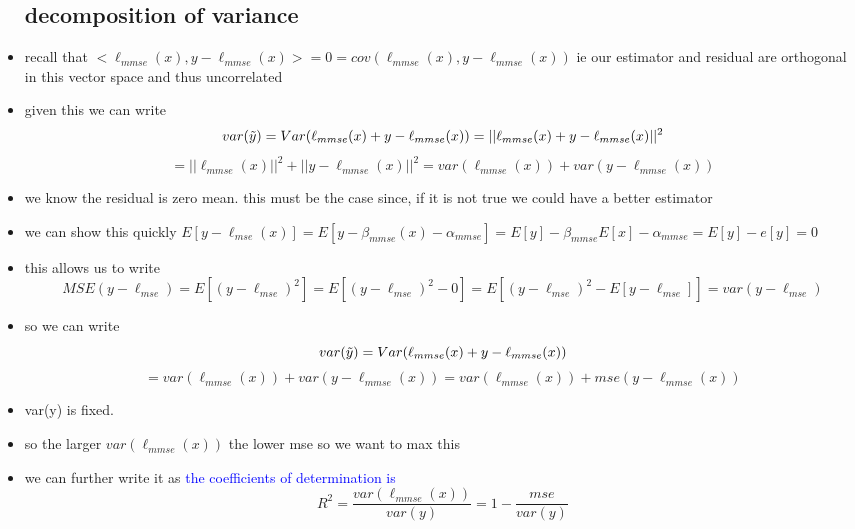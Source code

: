 \documentclass{article}
\begin{document}
\begin{itemize}
\subsection*{decomposition of variance}
\item recall that $<\ell_{mmse}(x), y-\ell_{mmse}(x)>=0=cov(\ell_{mmse}(x), y-\ell_{mmse}(x))$ ie our estimator and residual are orthogonal
in this vector space and thus uncorrelated
\item given this we can write $$var(\Tilde{y})=Var(\ell_{mmse}(x) + y-\ell_{mmse}(x))=||\ell_{mmse}(x) + y-\ell_{mmse}(x)||^2$$ 
$$=||\ell_{mmse}(x)||^2 + ||y-\ell_{mmse}(x)||^2=var(\ell_{mmse}(x)) + var(y-\ell_{mmse}(x))$$
\item we know the residual is zero mean. this must be the case since, if it is not true we could have a better estimator 
\item we can show this quickly $E[y-\ell_{mse}(x)]=E[y-\beta_{mmse}(x) -\alpha_{mmse}]=E[y]-\beta_{mmse}E[x] -\alpha_{mmse}
=E[y]-e[y]=0$
\item this allows us to write $$MSE(y-\ell_{mse})=E[(y-\ell_{mse})^2]=E[(y-\ell_{mse})^2-0]=E[(y-\ell_{mse})^2-E[y-\ell_{mse}]]=var(y-\ell_{mse})$$
\item so we can write $$var(\Tilde{y})=Var(\ell_{mmse}(x) + y-\ell_{mmse}(x))$$ $$=var(\ell_{mmse}(x)) + var(y-\ell_{mmse}(x))=var(\ell_{mmse}(x)) + mse(y-\ell_{mmse}(x))$$
\item var(y) is fixed. 
\item so the larger $var(\ell_{mmse}(x))$ the lower mse so we want to max this 
\item we can further write it as \textcolor{blue}{the coefficients of determination is }$$R^2=\frac{var(\ell_{mmse}(x))}{var(y)}=1-\frac{mse}{var(y)}$$

\end{itemize}
\end{document}
